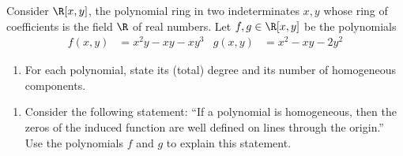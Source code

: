 %
%

\noindent{}Consider $\R[x, y]$, the polynomial ring in two indeterminates $x, y$ whose ring of coefficients is the field $\R$ of real numbers. Let $f, g \in \R[x, y]$ be the polynomials
\begin{align*}
f(x, y)
&=
x^{2} y - x y - x y^{3}
&
g(x, y)
&=
x^{2} - x y - 2 y^{2}
\end{align*}

\begin{enumerate}[label=(\alph*)]
\item For each polynomial, state its (total) degree and its number of homogeneous components.
\end{enumerate}




\begin{enumerate}[resume, label=(\alph*)]
\item\label{itm : LQ02b} Consider the following statement: ``If a polynomial is homogeneous, then the zeros of the induced function are well defined on lines through the origin.'' Use the polynomials $f$ and $g$ to explain this statement. 
\end{enumerate}

